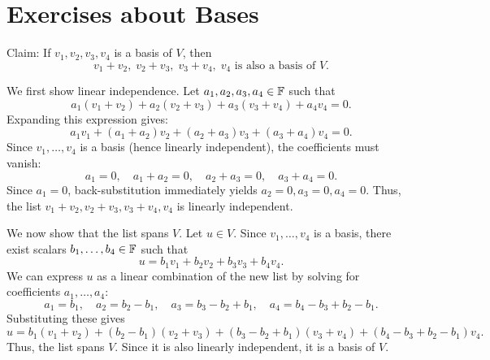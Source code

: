 \section*{Exercises about Bases}

\begin{xrcs}
  Claim: If $v_1, v_2, v_3, v_4$ is a basis of $V$, then
  \begin{equation}
    v_1 + v_2, \; v_2 + v_3, \; v_3 + v_4, \; v_4 \text{ is also a basis of } V.
  \end{equation}

  \begin{xprf}
    \StepOne We first show linear independence. Let $a_1, a_2, a_3, a_4 \in \mathbb{F}$ such that
    \begin{equation}
      a_1 (v_1+v_2) + a_2(v_2+v_3) + a_3(v_3+v_4) + a_4 v_4 = 0.
    \end{equation}
    Expanding this expression gives:
    \[
      a_1 v_1 + (a_1 + a_2) v_2 + (a_2 + a_3) v_3 + (a_3 + a_4) v_4 = 0.
    \]
    Since $v_1, \ldots, v_4$ is a basis (hence linearly independent), the coefficients must vanish:
    \[
      a_1 = 0, \quad a_1 + a_2 = 0, \quad a_2 + a_3 = 0, \quad a_3 + a_4 = 0.
    \]
    Since $a_1 = 0$, back-substitution immediately yields $a_2 = 0, a_3 = 0, a_4 = 0$.
    Thus, the list $v_1 + v_2, v_2 + v_3, v_3+v_4, v_4$ is linearly independent.

    \StepTwo We now show that the list spans $V$. Let $u \in V$. Since $v_1, \dots, v_4$ is a basis, there exist scalars $b_1, \dots, b_4 \in \mathbb{F}$ such that
    \begin{equation}
      \label{eq: equation of u}
      u = b_1 v_1 + b_2 v_2 + b_3 v_3 + b_4 v_4.
    \end{equation}
    We can express $u$ as a linear combination of the new list by solving for coefficients $a_1, \dots, a_4$:
    \[
      a_1 = b_1, \quad a_2 = b_2 - b_1, \quad a_3 = b_3 - b_2 + b_1, \quad a_4 = b_4 - b_3 + b_2 - b_1.
    \]
    Substituting these gives
    \[
      u = b_1 (v_1+v_2) + (b_2-b_1)(v_2+v_3) + (b_3 - b_2 + b_1)(v_3 + v_4) + (b_4 - b_3 + b_2 - b_1) v_4.
    \]
    Thus, the list spans $V$. Since it is also linearly independent, it is a basis of $V$.
  \end{xprf}
\end{xrcs}

